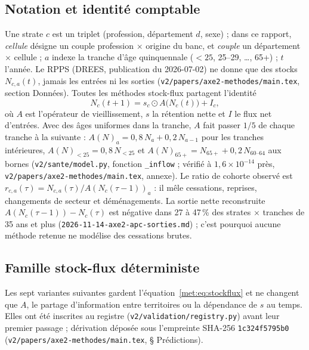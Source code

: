 \subsection{Notation et identité comptable}
\label{met:notation}
Une strate $c$ est un triplet (profession, département $d$, sexe) ; dans ce rapport, \emph{cellule} désigne
un couple profession $\times$ origine du banc, et \emph{couple} un département $\times$ cellule ; $a$ indexe la tranche d'âge
quinquennale ($<25$, 25--29, \dots, 65+) ; $t$ l'année. Le RPPS (DREES, publication du 2026-07-02) ne
donne que des stocks $N_{c,a}(t)$, jamais les entrées ni les sorties
(\texttt{v2/papers/axe2-methodes/main.tex}, section Données). Toutes les méthodes stock-flux partagent
l'identité
\begin{equation}
  N_c(t+1) = s_c \odot A\big(N_c(t)\big) + I_c,
  \label{met:eq:stockflux}
\end{equation}
où $A$ est l'opérateur de vieillissement, $s$ la rétention nette et $I$ le flux net d'entrées. Avec des
âges uniformes dans la tranche, $A$ fait passer $1/5$ de chaque tranche à la suivante :
$A(N)_a = 0{,}8\,N_a + 0{,}2\,N_{a-1}$ pour les tranches intérieures, $A(N)_{<25} = 0{,}8\,N_{<25}$ et
$A(N)_{65+} = N_{65+} + 0{,}2\,N_{60\text{--}64}$ aux bornes (\texttt{v2/sante/model.py}, fonction
\texttt{\_inflow} ; vérifié à $1{,}6\times10^{-14}$\mesure{} près,
\texttt{v2/papers/axe2-methodes/main.tex}, annexe). Le ratio de cohorte observé est
$r_{c,a}(\tau) = N_{c,a}(\tau)/A(N_c(\tau-1))_a$ : il mêle cessations, reprises, changements de secteur et
déménagements. La sortie nette reconstruite $A(N_c(\tau-1)) - N_c(\tau)$ est négative dans 27 à 47\,\%\mesure{} des
strates $\times$ tranches de 35 ans et plus (\texttt{2026-11-14-axe2-apc-sorties.md}) ; c'est pourquoi aucune méthode retenue ne
modélise des cessations brutes.

\subsection{Famille stock-flux déterministe}
\label{met:stockflux}
Les sept variantes suivantes gardent l'équation~\eqref{met:eq:stockflux} et ne changent que $A$, le partage
d'information entre territoires ou la dépendance de $s$ au temps. Elles ont été inscrites au registre
(\texttt{v2/validation/registry.py}) avant leur premier passage ; dérivation déposée sous l'empreinte
SHA-256 \texttt{1c324f5795b0} (\texttt{v2/papers/axe2-methodes/main.tex}, § Prédictions).

